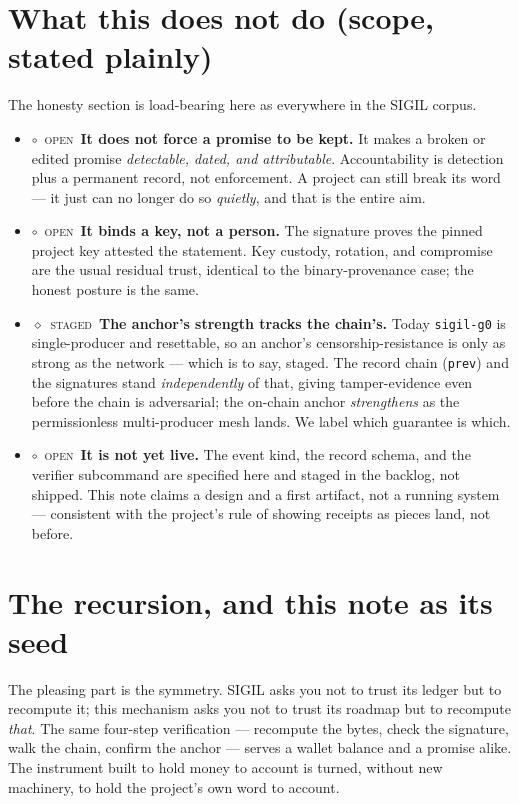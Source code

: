\documentclass[10pt,a4paper]{article}
\newcommand{\stG}{\textcolor{sigilviolet}{$\diamond$}~{\scriptsize\textcolor{sigilviolet}{\textsc{staged}}}}
\newcommand{\stO}{\textcolor{sigilamber}{$\circ$}~{\scriptsize\textcolor{sigilamber}{\textsc{open}}}}
\begin{document}
\section{What this does not do (scope, stated plainly)}
The honesty section is load-bearing here as everywhere in the SIGIL corpus.

\begin{itemize}[leftmargin=1.2em,itemsep=3pt]
\item \stO~\textbf{It does not force a promise to be kept.} It makes a broken or
  edited promise \emph{detectable, dated, and attributable}. Accountability is
  detection plus a permanent record, not enforcement. A project can still break its
  word --- it just can no longer do so \emph{quietly}, and that is the entire aim.
\item \stO~\textbf{It binds a key, not a person.} The signature proves the pinned
  project key attested the statement. Key custody, rotation, and compromise are the
  usual residual trust, identical to the binary-provenance case; the honest posture is
  the same.
\item \stG~\textbf{The anchor's strength tracks the chain's.} Today \texttt{sigil-g0}
  is single-producer and resettable, so an anchor's censorship-resistance is only as
  strong as the network --- which is to say, staged. The record chain (\texttt{prev})
  and the signatures stand \emph{independently} of that, giving tamper-evidence even
  before the chain is adversarial; the on-chain anchor \emph{strengthens} as the
  permissionless multi-producer mesh lands. We label which guarantee is which.
\item \stO~\textbf{It is not yet live.} The event kind, the record schema, and the
  verifier subcommand are specified here and staged in the backlog, not shipped. This
  note claims a design and a first artifact, not a running system --- consistent with
  the project's rule of showing receipts as pieces land, not before.
\end{itemize}

\section{The recursion, and this note as its seed}
The pleasing part is the symmetry. SIGIL asks you not to trust its ledger but to
recompute it; this mechanism asks you not to trust its roadmap but to recompute
\emph{that}. The same four-step verification --- recompute the bytes, check the
signature, walk the chain, confirm the anchor --- serves a wallet balance and a
promise alike. The instrument built to hold money to account is turned, without new
machinery, to hold the project's own word to account.
\end{document}
